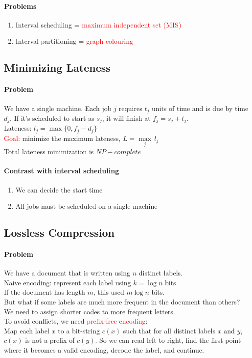 \documentclass[11pt]{article}
\begin{document}
\paragraph{Problems}
\begin{enumerate}
	\item Interval scheduling = \textcolor{red}{maximum independent set (MIS)}
	\item Interval partitioning = \textcolor{red}{graph colouring}
\end{enumerate}

\subsection{Minimizing Lateness}
\paragraph{Problem}
We have a single machine. Each job $j$ requires $t_j$ units of time and is due by time $d_j$. If it's scheduled to start as $s_j$, it will finish at $f_j = s_j + t_j$.\\
Lateness: $l_j = \max\{0, f_j - d_j\}$\\
\textcolor{red}{Goal:} minimize the maximum lateness, $L = \underset{j}{\max} \,l_j$ \\
Total lateness minimization is $NP-complete$

\paragraph{Contrast with interval scheduling}
\begin{enumerate}
	\item We can decide the start time
	\item All jobs must be scheduled on a single machine
\end{enumerate}

\subsection{Lossless Compression}
\paragraph{Problem}
We have a document that is written using $n$ distinct labels. \\
Naive encoding: represent each label using $k = \log n$ bits \\
If the document has length $m$, this used $m \log n$ bits. \\
But what if some labels are much more frequent in the document than others? We need to assign shorter codes to more frequent letters. \\
To avoid conflicts, we need \textcolor{red}{prefix-free encoding}: \\
Map each label $x$ to a bit-string $c(x)$ such that for all distinct labels $x$ and $y$, $c(x)$ is not a prefix of $c(y)$. So we can read left to right, find the first point where it becomes a valid encoding, decode the label, and continue.
\end{document}
